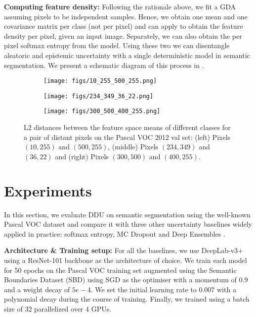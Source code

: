 \documentclass{article}
\begin{document}
\textbf{Computing feature density:} Following the rationale above, we fit a GDA assuming pixels to be independent samples. Hence, we obtain one mean and one covariance matrix per class (not per pixel) and can apply  to obtain the feature density per pixel, given an input image. Separately, we can also obtain the per pixel softmax entropy from the model. Using these two we can disentangle aleatoric and epistemic uncertainty with a single deterministic model in semantic segmentation. We present a schematic diagram of this process in .

\begin{figure}[t!]
    \centering
    \begin{subfigure}{0.3\linewidth}
        \texttt{[image: figs/10\_255\_500\_255.png]}
        \label{fig:p1_matrix}
    \end{subfigure}
    \begin{subfigure}{0.3\linewidth}
        \centering
        \texttt{[image: figs/234\_349\_36\_22.png]}
        \label{fig:p2_matrix}
    \end{subfigure}
    \begin{subfigure}{0.3\linewidth}
        \centering
        \texttt{[image: figs/300\_500\_400\_255.png]}
        \label{fig:p3_matrix}
    \end{subfigure} 
    \vspace{-3mm}
    \caption{
    L2 distances between the feature space means of different classes for a pair of distant pixels on the Pascal VOC 2012 val set: (left) Pixels $(10, 255)$ and $(500, 255)$, (middle) Pixels $(234, 349)$ and $(36,22)$ and (right) Pixels $(300, 500)$ and $(400, 255)$.
    }
    \label{fig:l2_dist}
    \vspace{-5mm}
\end{figure}


\section{Experiments}
\label{sec:experiments}

In this section, we evaluate DDU on semantic segmentation using the well-known Pascal VOC \citep{everingham2010pascal} dataset and compare it with three other uncertainty baselines widely applied in practice: softmax entropy, MC Dropout \citep{gal2016dropout} and Deep Ensembles \citep{deep_ensembles}.

\textbf{Architecture \& Training setup:} For all the baselines, we use DeepLab-v3+ \citep{chen2017rethinking} using a ResNet-101 \citep{he2016deep} backbone as the architecture of choice. We train each model for 50 epochs on the Pascal VOC training set augmented using the Semantic Boundaries Dataset (SBD) \citep{BharathICCV2011} using SGD as the optimiser with a momentum of $0.9$ and a weight decay of $5e-4$. We set the initial learning rate to $0.007$ with a polynomial decay during the course of training. Finally, we trained using a batch size of $32$ parallelized over 4 GPUs.
\end{document}

